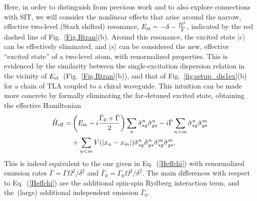 \documentclass[pra,twocolumn,showpacs,preprintnumbers,amsmath,amssymb]{revtex4-1}
\begin{document}
Here, in order to distinguish from previous work and to also explore connections with SIT, we will consider the nonlinear effects that arise around the narrow, effective two-level (Stark shifted) resonance, $E_{\rm st}\sim -\delta-\frac{\Omega^2}{\delta}$, indicated by the red dashed line of Fig.~\ref{Fig.Rtran}(b). Around this resonance, the excited state $|e\rangle$ can be effectively eliminated, and $|s\rangle$ can be considered the new, effective ``excited state'' of a two-level atom, with renormalized properties. This is evidenced by the similarity between the single-excitation dispersion relation in the vicinity of $E_{\rm st}$~(Fig.~\ref{Fig.Rtran}(b)), and that of Fig.~\ref{fig:setup_dis1ex}(b) for a chain of TLA coupled to a chiral waveguide. This intuition can be made more concrete by formally eliminating the far-detuned excited state, obtaining the effective Hamiltonian
\begin{equation}\label{heffr_off}
\begin{split}
\hat H_{\rm eff}=&\left(E_{\rm st}-i\frac{\bar\Gamma_0+\bar\Gamma}{2}\right)\sum_n\hat\sigma^n_{sg}\hat\sigma^n_{gs}-i\bar\Gamma\sum_{n>m}\hat\sigma^n_{sg}\hat\sigma^m_{gs}\\
&+\sum_{n<m}V(|x_n-x_m|)\hat\sigma^n_{sg}\hat\sigma^n_{gs}\hat\sigma^m_{sg}\hat\sigma^m_{gs}.
\end{split}
\end{equation}
This is indeed equivalent to the one given in Eq.~(\ref{Heffchi}) with renormalized emission rates $\bar\Gamma=\Gamma\Omega^2/\delta^2$ and $\bar\Gamma_0=\Gamma_0\Omega^2/\delta^2$.
The main differences with respect to Eq.~(\ref{Heffchi}) are the additional spin-spin Rydberg interaction term, and the~(large) additional independent emission $\bar\Gamma_0$. 
\end{document}
